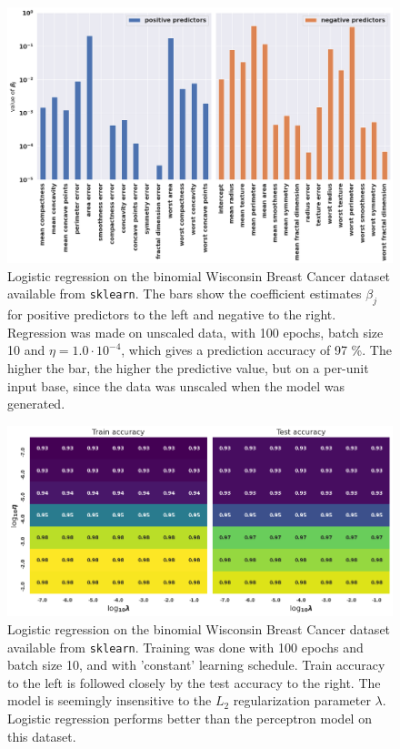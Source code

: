 \documentclass[]{article}
\begin{document}
\begin{figure}[!htb]
	\centering
	\includegraphics[width=1\linewidth]{log_breast_cancer_bars.png}
	\caption{Logistic regression on the binomial Wisconsin Breast Cancer dataset available from \lstinline|sklearn|. The bars show the coefficient estimates $\beta_j$ for positive predictors to the left and negative to the right. Regression was made on unscaled data, with 100 epochs, batch size 10 and $\eta = 1.0 \cdot 10^{-4}$, which gives a prediction accuracy of 97 \%. The higher the bar, the higher the predictive value, but on a per-unit input base, since the data was unscaled when the model was generated.}
	\label{fig:log_breast_cancer_bars}
\end{figure}


\begin{figure}[!htb]
	\centering
	\includegraphics[width=1\linewidth]{log_breast_cancer.png}
	\caption{Logistic regression on the binomial Wisconsin Breast Cancer dataset available from \lstinline|sklearn|. Training was done with 100 epochs and batch size 10, and with 'constant' learning schedule. Train accuracy to the left is followed closely by the test accuracy to the right. The model is seemingly insensitive to the $L_2$ regularization parameter $\lambda$. Logistic regression performs better than the perceptron model on this dataset.}
	\label{fig:log_breast_cancer}
\end{figure}
\end{document}

